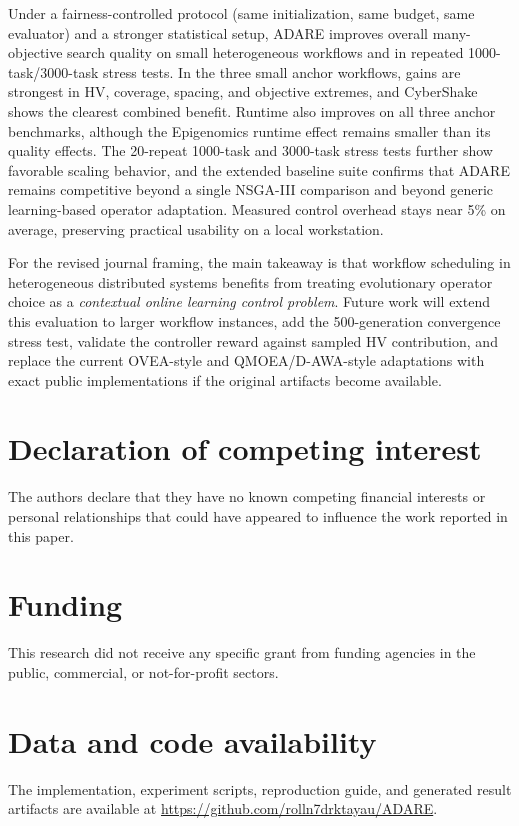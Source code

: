 \documentclass[preprint,12pt]{elsarticle}
\begin{document}
Under a fairness-controlled protocol (same initialization, same budget, same evaluator) and a stronger statistical setup, ADARE improves overall many-objective search quality on small heterogeneous workflows and in repeated 1000-task/3000-task stress tests. In the three small anchor workflows, gains are strongest in HV, coverage, spacing, and objective extremes, and CyberShake shows the clearest combined benefit. Runtime also improves on all three anchor benchmarks, although the Epigenomics runtime effect remains smaller than its quality effects. The 20-repeat 1000-task and 3000-task stress tests further show favorable scaling behavior, and the extended baseline suite confirms that ADARE remains competitive beyond a single NSGA-III comparison and beyond generic learning-based operator adaptation. Measured control overhead stays near 5\% on average, preserving practical usability on a local workstation.

For the revised journal framing, the main takeaway is that workflow scheduling in heterogeneous distributed systems benefits from treating evolutionary operator choice as a \emph{contextual online learning control problem}. Future work will extend this evaluation to larger workflow instances, add the 500-generation convergence stress test, validate the controller reward against sampled HV contribution, and replace the current OVEA-style and QMOEA/D-AWA-style adaptations with exact public implementations if the original artifacts become available.
\enlargethispage{3\baselineskip}

\section*{Declaration of competing interest}
The authors declare that they have no known competing financial interests or personal relationships that could have appeared to influence the work reported in this paper.

\section*{Funding}
This research did not receive any specific grant from funding agencies in the public, commercial, or not-for-profit sectors.

\section*{Data and code availability}
The implementation, experiment scripts, reproduction guide, and generated result artifacts are available at \url{https://github.com/rolln7drktayau/ADARE}.
\end{document}
